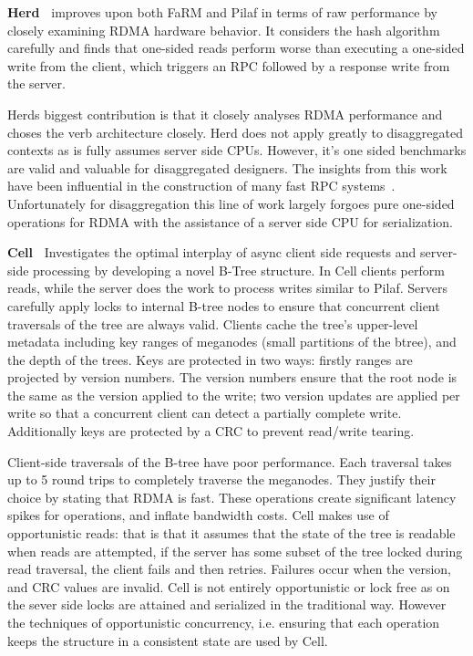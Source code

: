 \textbf{Herd~\cite{herd}} improves upon both FaRM and Pilaf in terms of raw
performance by closely examining RDMA hardware behavior. It considers the hash
algorithm carefully and finds that one-sided reads perform worse than executing
a one-sided write from the client, which triggers an RPC followed by a response
write from the server.

Herds biggest contribution is that it closely analyses RDMA performance and
choses the verb architecture closely. Herd does not apply greatly to
disaggregated contexts as is fully assumes server side CPUs. However, it's one
sided benchmarks are valid and valuable for disaggregated designers. The
insights from this work have been influential in the construction of many fast
RPC systems~\cite{erpc,faast,storm,1rma}. Unfortunately for disaggregation this
line of work largely forgoes pure one-sided operations for RDMA with the
assistance of a server side CPU for serialization.

\textbf{Cell~\cite{cell}} Investigates the optimal interplay of async client
side requests and server-side processing by developing a novel B-Tree structure.
In Cell clients perform reads, while the server does the work to process writes
similar to Pilaf.
%
Servers carefully apply locks to internal B-tree nodes to ensure that concurrent
client traversals of the tree are always valid. Clients cache the tree's
upper-level metadata including key ranges of meganodes (small partitions of the
btree), and the depth of the trees.
%
Keys are protected in two ways: firstly ranges are projected by version numbers.
The version numbers ensure that the root node is the same as the version applied
to the write; two version updates are applied per write so that a concurrent
client can detect a partially complete write. Additionally keys are protected by
a CRC to prevent read/write tearing.

Client-side traversals of the B-tree have poor performance. Each traversal takes
up to 5 round trips to completely traverse the meganodes. They justify their
choice by stating that RDMA is fast. These operations create significant latency
spikes for operations, and inflate bandwidth costs.
%
Cell makes use of opportunistic reads: that is that it assumes that the state of
the tree is readable when reads are attempted, if the server has some subset of
the tree locked during read traversal, the client fails and then retries.
Failures occur when the version, and CRC values are invalid. Cell is not
entirely opportunistic or lock free as on the sever side locks are attained and
serialized in the traditional way. However the techniques of opportunistic
concurrency, i.e. ensuring that each operation keeps the structure in a
consistent state are used by Cell.




